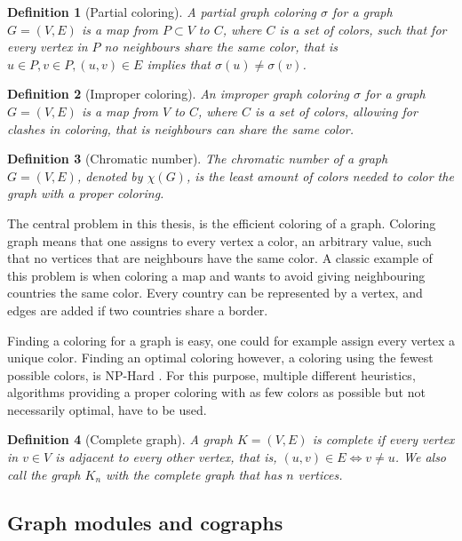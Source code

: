 \documentclass[a4paper]{article}
\newtheorem{definition}{Definition}[section]
\begin{document}
\begin{definition}[Partial coloring]{\cite{Constructive}}
    A partial graph coloring $\sigma$ for a graph $G = (V,E)$ is a map from $P \subset V$ to $C$,
    where $C$ is a set of colors, such that for every vertex in $P$ no neighbours 
    share the same color, that is $u \in P,v \in P, (u,v) \in E$  implies that $\sigma(u) \neq \sigma(v)$.
\end{definition}
\begin{definition}[Improper coloring]{\cite{Constructive}}
    An improper graph coloring $\sigma$ for a graph $G = (V,E)$ is a map from
    $V$ to $C$, where $C$ is a set of colors, allowing for clashes in coloring,
    that is neighbours can share the same color.
\end{definition}
\begin{definition}[Chromatic number]
    The chromatic number of a graph $G = (V,E)$, denoted by $\chi(G)$, is the
    least amount of colors needed to color the graph with a proper coloring.
\end{definition}
The central problem in this thesis, is the efficient coloring of a graph.
Coloring graph means that one assigns to every vertex a color, an arbitrary
value, such that no vertices that are neighbours have the same color. A classic
example of this problem is when coloring a map and wants to avoid giving
neighbouring countries the same color.  Every country can be represented by a
vertex, and edges are added if two countries share a border.

Finding a coloring for a graph is easy, one could for example 
assign every vertex a unique color. Finding an optimal coloring however, a coloring using the
fewest possible colors, is NP-Hard \cite{NPHard}. For this purpose, multiple
different heuristics, algorithms providing a proper coloring with as few colors
as possible but not necessarily optimal, have to be used.

\begin{definition}[Complete graph]
    A graph $K = (V,E)$ is complete if every vertex in $v \in V$ is adjacent to
    every other vertex, that is, $ (u,v) \in E \iff v \neq u$. We also call the
    graph $K_n$ with the complete graph that has $n$ vertices.
\end{definition}

\subsection{Graph modules and cographs}
\label{sec:GraphModules}
\end{document}
